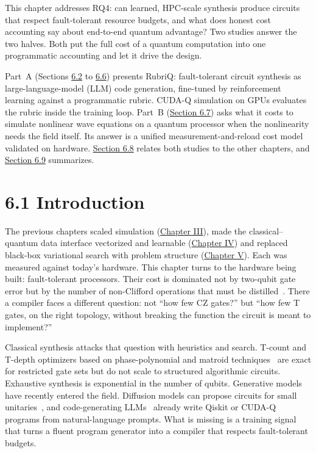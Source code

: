 \documentclass{report}
\theoremstyle{plain}
\theoremstyle{definition}
\theoremstyle{remark}
\begin{document}
This chapter addresses RQ4: can learned, HPC-scale synthesis produce circuits that respect fault-tolerant resource budgets, and what does honest cost accounting say about end-to-end quantum advantage? Two studies answer the two halves. Both put the full cost of a quantum computation into one programmatic accounting and let it drive the design.

Part~A (Sections \hyperref[sec:syn:prelim]{6.2} to \hyperref[sec:syn:rubriq-discussion]{6.6}) presents RubriQ: fault-tolerant circuit synthesis as large-language-model (LLM) code generation, fine-tuned by reinforcement learning against a programmatic rubric. CUDA-Q simulation on GPUs evaluates the rubric inside the training loop. Part~B (\hyperref[sec:syn:waves]{Section 6.7}) asks what it costs to simulate nonlinear wave equations on a quantum processor when the nonlinearity needs the field itself. Its answer is a unified measurement-and-reload cost model validated on hardware. \hyperref[sec:syn:relation]{Section 6.8} relates both studies to the other chapters, and \hyperref[sec:syn:summary]{Section 6.9} summarizes.

\section{6.1 Introduction}\label{sec:syn:intro}

The previous chapters scaled simulation (\hyperref[ch:qgear]{Chapter III}), made the classical--quantum data interface vectorized and learnable (\hyperref[ch:qml]{Chapter IV}) and replaced black-box variational search with problem structure (\hyperref[ch:nisq]{Chapter V}). Each was measured against today's hardware. This chapter turns to the hardware being built: fault-tolerant processors. Their cost is dominated not by two-qubit gate error but by the number of non-Clifford operations that must be distilled~\cite{bravyi2005magic,fowler2012surfacecodes}. There a compiler faces a different question: not ``how few CZ gates?'' but ``how few T gates, on the right topology, without breaking the function the circuit is meant to implement?''

Classical synthesis attacks that question with heuristics and search. T-count and T-depth optimizers based on phase-polynomial and matroid techniques~\cite{amy2014tpar} are exact for restricted gate sets but do not scale to structured algorithmic circuits. Exhaustive synthesis is exponential in the number of qubits. Generative models have recently entered the field. Diffusion models can propose circuits for small unitaries~\cite{furrutter2024genqc}, and code-generating LLMs~\cite{chen2021codex} already write Qiskit or CUDA-Q programs from natural-language prompts. What is missing is a training signal that turns a fluent program generator into a compiler that respects fault-tolerant budgets.
\end{document}
